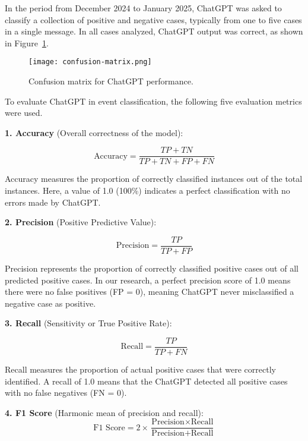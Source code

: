 \documentclass[preprint,12pt,number]{elsarticle}
\begin{document}
In the period from December 2024 to January 2025, ChatGPT was asked to classify a collection of positive and negative cases, typically from one to five cases in a single message. In all cases analyzed, ChatGPT output was correct, as shown in Figure~\ref{fig:confusion-matrix}. 

\begin{figure}
    \centering
    \texttt{[image: confusion-matrix.png]}
    \caption{Confusion matrix for ChatGPT performance.}
    \label{fig:confusion-matrix}
\end{figure}

To evaluate ChatGPT in event classification, the following five evaluation metrics were used.

\textbf{1. Accuracy} (Overall correctness of the model):

\begin{equation} \label{eq:Accuracy}
    \text{Accuracy} = \frac{TP + TN}{TP + TN + FP + FN}
\end{equation}

Accuracy measures the proportion of correctly classified instances out of the total instances. Here, a value of 1.0 (100\%) indicates a perfect classification with no errors made by ChatGPT.

\textbf{2. Precision} (Positive Predictive Value):

\begin{equation} \label{eq:Precision}
    \text{Precision} = \frac{TP}{TP + FP}    
\end{equation}

Precision represents the proportion of correctly classified positive cases out of all predicted positive cases. In our research, a perfect precision score of 1.0 means there were no false positives (FP = 0), meaning ChatGPT never misclassified a negative case as positive.

\textbf{3. Recall} (Sensitivity or True Positive Rate):

\begin{equation}\label{eq:Recall}
    \text{Recall} = \frac{TP}{TP + FN}    
\end{equation}

Recall measures the proportion of actual positive cases that were correctly identified. A recall of 1.0 means that the ChatGPT detected all positive cases with no false negatives (FN = 0).

\textbf{4. F1 Score} (Harmonic mean of precision and recall):
\begin{equation}\label{eq:F1-Score}
    \text{F1 Score} = 2 \times \frac{\text{Precision} \times \text{Recall}}{\text{Precision} + \text{Recall}}    
\end{equation}
\end{document}
